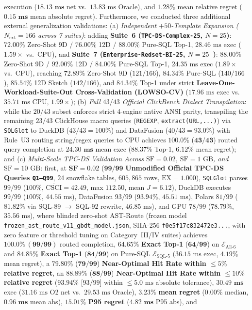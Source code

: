 \documentclass[10pt,a4paper]{article}
\begin{document}
\begin{enumerate}[leftmargin=1.5em,itemsep=0.8pt]
execution ($\mathbf{18.13\text{ ms}}$ net vs.\ $13.83\text{ ms}$ Oracle), and $\mathbf{1.28\%}$ mean relative regret ($\mathbf{0.15\text{ ms}}$ mean absolute regret). Furthermore, we conducted three additional external generalization validations: (a) \emph{Independent $+50$-Template Expansion ($N_{\text{ext}}=166$ across 7 suites)}: adding \textbf{Suite~6 (\texttt{TPC-DS-Complex-25}, $N=25$)}: $72.00\%$ Zero-Shot 9D / $76.00\%$ 12D / $88.00\%$ Pure-SQL Top-1, $28.46\text{ ms}$ exec ($1.59\times$ vs.\ CPU), and \textbf{Suite~7 (\texttt{Enterprise-Redset-BI-25}, $N=25$~\cite{vanrenen2024redset})}: $88.00\%$ Zero-Shot 9D / $92.00\%$ 12D / $84.00\%$ Pure-SQL Top-1, $24.35\text{ ms}$ exec ($1.89\times$ vs.\ CPU), reaching $\mathbf{72.89\%}$ Zero-Shot 9D ($121/166$), $\mathbf{84.34\%}$ Pure-SQL ($140/166$), $\mathbf{85.54\%}$ 12D Sketch ($142/166$), and $\mathbf{84.34\%}$ Top-1 under strict \textbf{Leave-One-Workload-Suite-Out Cross-Validation (LOWSO-CV)} ($17.96\text{ ms}$ exec vs.\ $35.71\text{ ms}$ CPU, $1.99\times$); (b) \emph{Full $43/43$ Official ClickBench Dialect Transpilation}: while the $20/43$ subset enforces strict 4-engine native ANSI parity, transpiling the remaining $23/43$ ClickHouse macro queries (\texttt{REGEXP}, \texttt{extract(URL,...)}) via \texttt{SQLGlot} to DuckDB ($43/43 = 100\%$) and DataFusion ($40/43 = 93.0\%$) with Rule~U3 routing string/regex queries to CPU achieves $\mathbf{100.0\%}$ ($\mathbf{43/43}$) routed query completion at $\mathbf{24.30\text{ ms}}$ mean exec ($\mathbf{88.37\%}$ Top-1, $\mathbf{6.12\%}$ mean regret); and (c) \emph{Multi-Scale TPC-DS Validation Across $\text{SF}=0.02$, $\text{SF}=1\text{ GB}$, and $\text{SF}=10\text{ GB}$}: first, at $\mathbf{\text{SF}=0.02}$ ($\mathbf{99/99}$ \textbf{Unmodified Official TPC-DS Queries \texttt{Q1--Q99}}, $24$ snowflake tables, $605{,}865$ rows, $\text{EX}=1.000$), \texttt{SQLGlot} parses $99/99$ ($100\%$, $\overline{\text{CSCI}}=42.49$, max $112.50$, mean $J=6.12$), DuckDB executes $99/99$ ($100\%$, $44.55\text{ ms}$), DataFusion $93/99$ ($93.94\%$, $45.51\text{ ms}$), Polars $81/99$ ($81.82\%$ via SQL-89 $\rightarrow$ SQL-92 rewrite, $46.85\text{ ms}$), and GPU $78/99$ ($78.79\%$, $35.56\text{ ms}$), where blinded zero-shot AST-Route (frozen model \texttt{frozen\_ast\_route\_v11\_gbdt\_model.json}, SHA-256 \texttt{f0e5f17c832472e3...}, with zero feature or threshold tuning on Category~III/IV suites) achieves $\mathbf{100.0\%\ (99/99)}$ routed completion, $\mathbf{64.65\%}$ \textbf{Exact Top-1} ($\mathbf{64/99}$) on $\mathcal{E}_{\text{All-6}}$ and $\mathbf{84.85\%}$ \textbf{Exact Top-1} ($\mathbf{84/99}$) on Pure-SQL $\mathcal{E}_{\text{SQL-5}}$ ($36.15\text{ ms}$ exec, $4.19\%$ mean regret), a $\mathbf{79.80\%}$ ($\mathbf{79/99}$) \textbf{Near-Optimal Hit Rate within $\le 5\%$ relative regret}, an $\mathbf{88.89\%}$ ($\mathbf{88/99}$) \textbf{Near-Optimal Hit Rate within $\le 10\%$ relative regret} ($\mathbf{93.94\%}$ [$93/99$] within $\le 5.0\text{ ms}$ absolute tolerance), $\mathbf{30.49\text{ ms}}$ exec ($31.16\text{ ms}$ O2 net vs.\ $29.53\text{ ms}$ Oracle), $\mathbf{3.23\%}$ \textbf{mean regret} ($\mathbf{0.00\%}$ median, $\mathbf{0.96\text{ ms}}$ mean abs), $\mathbf{15.01\%}$ \textbf{P95 regret} ($\mathbf{4.82\text{ ms}}$ P95 abs), and 
\end{enumerate}
\end{document}
